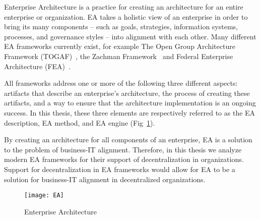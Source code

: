 Enterprise Architecture is a practice for creating an architecture for an entire enterprise or organization. EA takes a holistic view of an enterprise in order to bring its many components -- such as goals, strategies, information systems, processes, and governance styles -- into alignment with each other. Many different EA frameworks currently exist, for example The Open Group Architecture Framework (TOGAF)~\cite{togaf9.1}, the Zachman Framework~\cite{zachman} and Federal Enterprise Architecture (FEA)~\cite{FEA_PMO2007}. 

All frameworks address one or more of the following three different aspects: artifacts that describe an enterprise's architecture, the process of creating these artifacts, and a way to ensure that the architecture implementation is an ongoing success. In this thesis, these three elements are respectively referred to as the EA description, EA method, and EA engine (Fig~\ref{fig:EA_general}). 

By creating an architecture for all components of an enterprise, EA is a solution to the problem of business-IT alignment. Therefore, in this thesis we analyze modern EA frameworks for their support of decentralization in organizations. Support for decentralization in EA frameworks would allow for EA to be a solution for business-IT alignment in decentralized organizations. 

\begin{figure}
\texttt{[image: EA]}
\caption{Enterprise Architecture}
\label{fig:EA_general}
\end{figure}



